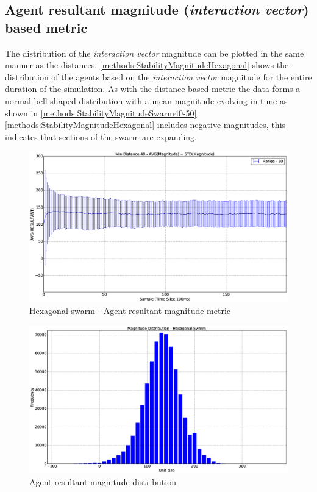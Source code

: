 \subsection[Agent resultant magnitude based metric]{Agent resultant magnitude (\textit{interaction vector}) based metric}
The distribution of the \textit{interaction vector} magnitude can be plotted in the same manner as the distances. \autoref{methods:StabilityMagnitudeHexagonal} shows the distribution of the agents based on the \textit{interaction vector} magnitude for the entire duration of the simulation. As with the distance based metric the data forms a normal bell shaped distribution with a mean magnitude evolving in time as shown in \autoref{methods:StabilityMagnitudeSwarm40-50}. \autoref{methods:StabilityMagnitudeHexagonal} includes negative magnitudes, this indicates that sections of the swarm are expanding. 
\begin{figure}[H]
\begin{center}
\includegraphics[width=13cm]{CHAPTER-5/figures/StabilityMagnitudeSwarm40-50}
\end{center}
\caption{Hexagonal swarm - Agent resultant magnitude metric\label{methods:StabilityMagnitudeSwarm40-50}}
\end{figure}
\begin{figure}[H]
\begin{center}
\includegraphics[width=13cm]{CHAPTER-5/figures/StabilityMagnitudeHexagonal}
\end{center}
\caption{Agent resultant magnitude distribution\label{methods:StabilityMagnitudeHexagonal}}
\end{figure}

